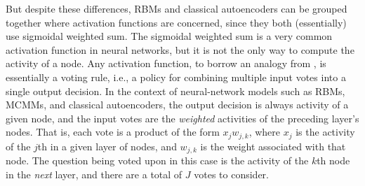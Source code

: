 %

But despite these differences, RBMs and classical autoencoders can be grouped together where activation functions are concerned, since they both (essentially) use sigmoidal weighted sum.
The sigmoidal weighted sum is a very common activation function in neural networks, 
but it is not the only way to compute the activity of a node. Any activation function, to borrow
an analogy from \citet{saund:94}, is essentially a voting rule, i.e.,  a policy 
for combining multiple input votes into a single output decision.  
In the context of neural-network models such as RBMs, MCMMs, and 
classical autoencoders, the output decision is always activity of a given node, 
and the input votes are the \emph{weighted} activities of the preceding layer's nodes. 
That is, each vote is a product of the form $x_{j} w_{j,k}$, where $x_{j}$ is the activity 
of the $j$th in a given layer of nodes, and $w_{j,k}$ is the weight associated with that 
node. The question being voted upon in this case is the activity of the $k$th node in the 
\emph{next} layer, and there are
a total of $J$ votes to consider.

